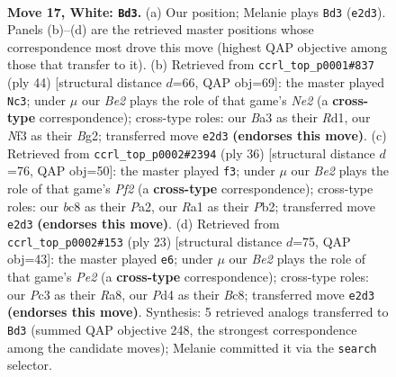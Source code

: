 \documentclass[11pt]{article}
\begin{document}
\clearpage

\begin{figure}[p]\centering
\begin{subfigure}{0.46\textwidth}\centering
\resizebox{\linewidth}{!}{%
\newchessgame
\chessboard[
  setfen={rnbqr2k/5p2/1p2pnp1/7p/p2P4/B1P2N1P/PQ2BPP1/R3R1K1 w - - 2 17},
  showmover=false,
  pgfstyle=straightmove, color=movearrow, markmove={e2-d3}
]}
\caption{}
\end{subfigure}\hfill
\begin{subfigure}{0.46\textwidth}\centering
\resizebox{\linewidth}{!}{%
\newchessgame
\chessboard[
  setfen={2b1r1k1/2qn1p1p/1r1p2p1/1p2p3/4P3/1P4PP/2PQNPB1/3RR1K1 w - - 2 23},
  showmover=false,
  pgfstyle=straightmove, color=movearrow, markmove={e2-c3}
]}
\caption{}
\end{subfigure}
\\[4pt]
\begin{subfigure}{0.46\textwidth}\centering
\resizebox{\linewidth}{!}{%
\newchessgame
\chessboard[
  setfen={r1b1rnk1/1p2qpp1/2p4p/p2p4/3P4/2NBP3/PPQ2PPP/3RR1K1 w - - 2 19},
  showmover=false,
  pgfstyle=straightmove, color=movearrow, markmove={f2-f3}
]}
\caption{}
\end{subfigure}\hfill
\begin{subfigure}{0.46\textwidth}\centering
\resizebox{\linewidth}{!}{%
\newchessgame
\chessboard[
  setfen={r1bq1rk1/pp2pp1p/1n4p1/2pP4/4P3/1BP2N2/P4PPP/R2QK2R b KQ - 4 12},
  showmover=false,
  pgfstyle=straightmove, color=movearrow, markmove={e7-e6}
]}
\caption{}
\end{subfigure}
\caption{\textbf{Move 17, White: \texttt{Bd3}.} (a) Our position; Melanie plays \texttt{Bd3} (\texttt{e2d3}). Panels (b)--(d) are the retrieved master positions whose correspondence most drove this move (highest QAP objective among those that transfer to it). (b) Retrieved from \texttt{ccrl\_top\_p0001\#837} (ply 44) [structural distance $d$=66, QAP obj=69]: the master played \texttt{Nc3}; under $\mu$ our \emph{Be2} plays the role of that game's \emph{Ne2} (a \textbf{cross-type} correspondence); cross-type roles: our \emph{B}a3 as their \emph{R}d1, our \emph{N}f3 as their \emph{B}g2; transferred move \texttt{e2d3} \textbf{(endorses this move)}. (c) Retrieved from \texttt{ccrl\_top\_p0002\#2394} (ply 36) [structural distance $d$=76, QAP obj=50]: the master played \texttt{f3}; under $\mu$ our \emph{Be2} plays the role of that game's \emph{Pf2} (a \textbf{cross-type} correspondence); cross-type roles: our \emph{b}c8 as their \emph{P}a2, our \emph{R}a1 as their \emph{P}b2; transferred move \texttt{e2d3} \textbf{(endorses this move)}. (d) Retrieved from \texttt{ccrl\_top\_p0002\#153} (ply 23) [structural distance $d$=75, QAP obj=43]: the master played \texttt{e6}; under $\mu$ our \emph{Be2} plays the role of that game's \emph{Pe2} (a \textbf{cross-type} correspondence); cross-type roles: our \emph{P}c3 as their \emph{R}a8, our \emph{P}d4 as their \emph{B}c8; transferred move \texttt{e2d3} \textbf{(endorses this move)}. Synthesis: 5 retrieved analogs transferred to \texttt{Bd3} (summed QAP objective 248, the strongest correspondence among the candidate moves); Melanie committed it via the \texttt{search} selector.}
\label{fig:thought-m32}
\end{figure}
\end{document}
